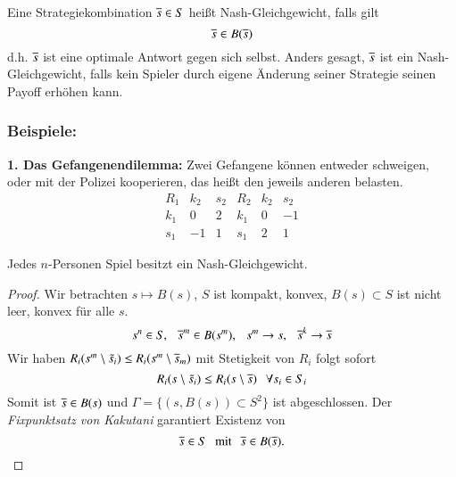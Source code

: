 \begin{defi}
    Eine Strategiekombination $\overline s\in S$ heißt Nash-Gleichgewicht, falls gilt
    \[
        \overline s \in B(\overline s)
    \]
    d.h. $\overline s$ ist eine optimale Antwort gegen sich selbst. Anders gesagt, $\overline s$ ist ein 
    Nash-Gleichgewicht, falls kein Spieler durch eigene Änderung seiner Strategie seinen Payoff erhöhen
    kann.
\end{defi}

\subsubsection*{Beispiele:}

    \textbf{1. Das Gefangenendilemma:}
    Zwei Gefangene können entweder schweigen, oder mit der Polizei kooperieren, das heißt den jeweils
    anderen belasten.
    \[
        \begin{array}{c|cc||c|cc} R_1& k_2& s_2& R_2&k_2&s_2\\ \hline k_1&0&2&k_1&0&-1\\
            s_1&-1&1&s_1&2&1\end{array}
    \]
\begin{theorem}\label{2.18}
    Jedes $n$-Personen Spiel besitzt ein Nash-Gleichgewicht.
\end{theorem}

\begin{proof}
    Wir betrachten $s\mapsto B(s)$, $S$ ist kompakt, konvex, $B(s)\subset S$ ist nicht leer, konvex für
    alle $s$.
    \[
        s^n\in S, \hspace{.25cm} \overline s^m\in B(s^m), \hspace{.25cm} s^m\rightarrow s, \hspace{.25cm} \overline s^k\rightarrow \overline s
    \]
    Wir haben $R_i(s^m\setminus \tilde s_i)\leq R_i(s^m\setminus \overline s_m)$ mit Stetigkeit von $R_i$ folgt
    sofort
    \[
        R_i(s\setminus \tilde s_i) \leq R_i(s\setminus \overline s) \hspace{.25cm} \forall s_i\in S_i
    \]
    Somit ist $\overline s \in B(s)$ und $\Gamma= \{ (s,B(s))\subset S^2 \}$ ist abgeschlossen.
    Der \textit{Fixpunktsatz von Kakutani} garantiert Existenz von
    \[
        \overline s\in S \hspace{.25cm} \text{mit} \hspace{.25cm} \overline s \in B(\overline s).
    \]
\end{proof}
